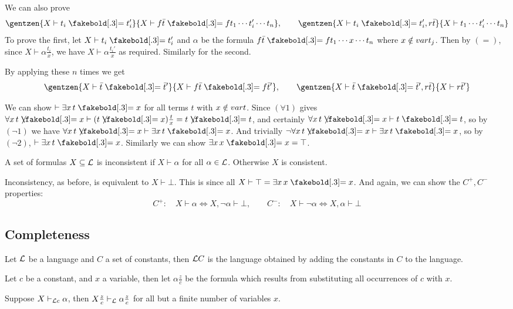 We can also prove
$$ \gentzen{X\vdash t_i\eq t_i'}{X\vdash f\bar t\eq ft_1\cdots t_i'\cdots t_n},
\qquad \gentzen{X\vdash t_i\eq t_i',r\bar t}{X\vdash t_1\cdots t_i'\cdots t_n} $$
To prove the first, let $X\vdash t_i\eq t_i'$ and $\alpha$ be the formula $f\bar t\eq ft_1\cdots x\cdots t_n$
where $x\notin{\sl var} t_j$.
Then by $(=)$, since $X\vdash\alpha\frac{t_i}x$, we have $X\vdash\alpha\frac{t_i'}x$ as required.
Similarly for the second.

By applying these $n$ times we get
$$ \gentzen{X\vdash\bar t\eq\bar t'}{X\vdash f\bar t\eq f\bar t'},\qquad
\gentzen{X\vdash\bar t\eq\bar t',r\bar t}{X\vdash r\bar t'} $$

We can show $\vdash\exists x\,t\eq x$ for all terms $t$
with $x\notin{\sl var} t$.
Since $(\forall1)$ gives $\forall x\,t\neqb x\vdash (t\neqb x)\frac tx=t\neqb t$, and certainly
$\forall x\,t\neqb x\vdash t\eq t$, so by $(\neg1)$ we have $\forall x\,t\neqb x\vdash\exists x\,t\eq x$.
And trivially $\neg\forall x\,t\neqb x\vdash\exists x\,t\eq x$, so by $(\neg2)$, $\vdash\exists x\,t\eq x$.
Similarly we can show $\exists x\,x\eq x=\top$.


\bdefn

    A set of formulas $X\subseteq{\cal L}$ is {\emphcolor inconsistent} if $X\vdash\alpha$ for all $\alpha\in{\cal L}$.
    Otherwise $X$ is consistent.

\edefn

Inconsistency, as before, is equivalent to $X\vdash\bot$.
This is since all $X\vdash\top=\exists x\,x\eq x$.
And again, we can show the $C^+,C^-$ properties:
$$ C^+:\quad X\vdash\alpha\iff X,\neg\alpha\vdash\bot,\qquad C^-:\quad X\vdash\neg\alpha\iff X,\alpha\vdash\bot
$$

\subsection{Completeness}

\bdefn

    Let ${\cal L}$ be a language and $C$ a set of constants, then ${\cal L}C$ is the language obtained by adding
    the constants in $C$ to the language.

\edefn

Let $c$ be a constant, and $x$ a variable, then let $\alpha\frac zc$ be the formula which results from
substituting all occurrences of $c$ with $x$.

\blemm

    Suppose $X\vdash_{{\cal L}c}\alpha$, then $X{{z}\over{c}}\vdash_{{\cal L}}\alpha{{z}\over{c}}$ for all but a finite number of
    variables $x$.

